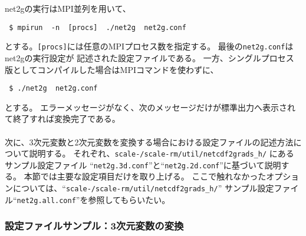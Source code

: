 net2gの実行はMPI並列を用いて、
\begin{verbatim}
 $ mpirun  -n  [procs]  ./net2g  net2g.conf
\end{verbatim}
とする。\verb|[procs]|には任意のMPIプロセス数を指定する。
最後の\verb|net2g.conf|はnet2gの実行設定が
記述された設定ファイルである。
一方、シングルプロセス版としてコンパイルした場合はMPIコマンドを使わずに、
\begin{verbatim}
 $ ./net2g  net2g.conf
\end{verbatim}
とする。
エラーメッセージがなく、次のメッセージだけが標準出力へ表示されて終了すれば変換完了である。\\

\\

次に、3次元変数と2次元変数を変換する場合における設定ファイルの記述方法について説明する。
それぞれ、\texttt{scale-\version/scale-rm/util/netcdf2grads\_h/} にあるサンプル設定ファイル
``\verb|net2g.3d.conf|''と``\verb|net2g.2d.conf|''に基づいて説明する。
本節では主要な設定項目だけを取り上げる。
ここで触れなかったオプションについては、``\texttt{scale-\version/scale-rm/util/netcdf2grads\_h/}''
サンプル設定ファイル``\verb|net2g.all.conf|''を参照してもらいたい。


\subsubsection{設定ファイルサンプル：3次元変数の変換}

\\

